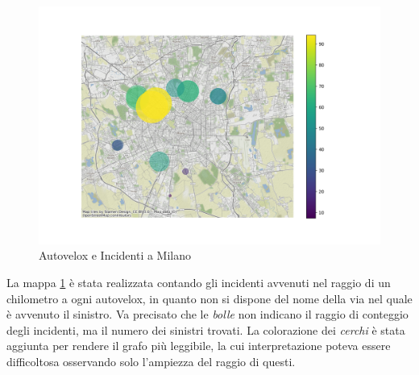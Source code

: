 \documentclass[a4paper,12pt]{report}
\newcommand{\quotestyle}[1]{\textit{#1}}
\begin{document}
\begin{figure}
    \includegraphics[width=\linewidth]{../src/autovelox/autovelox_incidenti.png}
    \caption{Autovelox e Incidenti a Milano}
    \label{fig:autovelox-incidenti}
\end{figure}

La mappa \ref{fig:autovelox-incidenti} è stata realizzata contando gli incidenti avvenuti 
nel raggio di un chilometro a ogni autovelox, in quanto non si dispone del nome della 
via nel quale è avvenuto il sinistro. 
Va precisato che le \quotestyle{bolle} non indicano il raggio di conteggio degli incidenti, ma 
il numero dei sinistri trovati. La colorazione dei \quotestyle{cerchi} è stata aggiunta per 
rendere il grafo più leggibile, la cui interpretazione poteva essere difficoltosa 
osservando solo l'ampiezza del raggio di questi.
\end{document}
